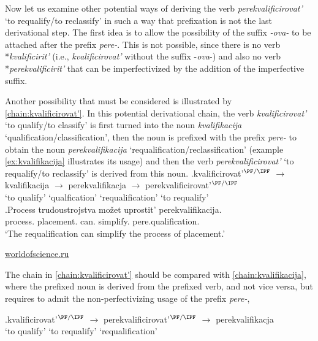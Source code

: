 Now let us examine other potential ways of deriving the verb \textit{perekvalificirovat'} `to requalify/to reclassify' in such a way that prefixation is not the last derivational step. The first idea is to allow the possibility of the suffix \textit{-ova-} to be attached after the prefix \textit{pere-}. This is not possible, since there is no verb *\textit{kvalificirit'} (i.e., \textit{kvalificirovat'} without the suffix -\textit{ova}-) and also no verb  *\textit{perekvalificirit'} that can be imperfectivized by the addition of the imperfective suffix.

Another possibility that must be considered is illustrated by \ref{chain:kvalificirovat'}. In this potential derivational chain, the verb \textit{kvalificirovat'} `to qualify/to classify' is first turned into the noun \textit{kvalifikacija} `qualification\slash classification', then the noun is prefixed with the prefix \textit{pere-} to obtain the noun \textit{perekvalifikacija}  `requalification/reclassification' (example \ref{ex:kvalifikacija} illustrates its usage) and then the verb \textit{perekvalificirovat'} `to requalify/to reclassify' is derived from this noun. 
\exg.\label{chain:kvalificirovat'}kvalificirovat'$^{{\PF}/{\IPF}}$ {$\rightarrow$} kvalifikacija {$\rightarrow$} perekvalifikacja {$\rightarrow$} {perekvalificirovat'$^{{\PF}/{\IPF}}$}\\
{`to qualify'} {} {`qualfication'} {} {`requalification'} {} {`to requalify'}\\

\exg.\label{ex:kvalifikacija}Process trudoustrojstva mo\v{z}et uprostit' perekvalifikacija.\\
process. placement. can. simplify. pere.qualification.\\
\vspace{0.5em}
`The requalification can simplify the process of placement.'
\begin{flushright}
\vspace{-0.5em}
\url{worldofscience.ru}
\end{flushright}

The chain in \ref{chain:kvalificirovat'} should be compared with \ref{chain:kvalifikacija}, where the prefixed noun is derived from the prefixed verb, and not vice versa, but requires to admit the non-perfectivizing usage of the prefix \textit{pere-},

\exg.\label{chain:kvalifikacija}kvalificirovat'$^{{\PF}/{\IPF}}$ {$\rightarrow$} {perekvalificirovat'$^{{\PF}/{\IPF}}$} {$\rightarrow$} perekvalifikacja\\
{`to qualify'} {} {`to requalify'} {} {`requalification'}\\


